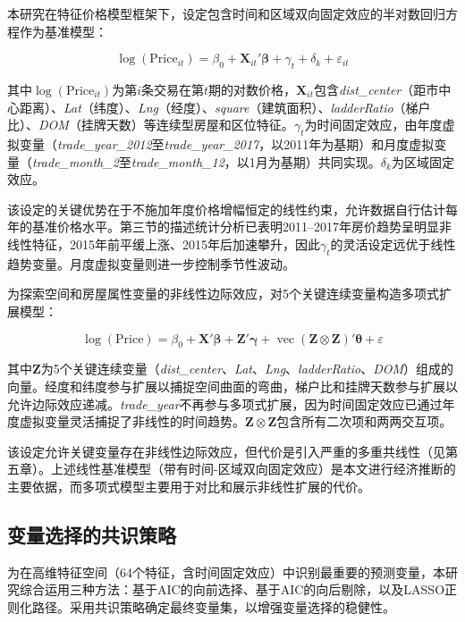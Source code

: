\documentclass[12pt,a4paper]{ctexart}
\begin{document}
本研究在特征价格模型框架下，设定包含时间和区域双向固定效应的半对数回归方程作为基准模型：

\begin{equation}\label{eq:baseline}
\log(\text{Price}_{it}) = \beta_0 + \bm{X}_{it}'\bm{\beta} + \gamma_t + \delta_k + \varepsilon_{it}
\end{equation}

其中$\log(\text{Price}_{it})$为第$i$条交易在第$t$期的对数价格，$\bm{X}_{it}$包含\textit{dist\_center}（距市中心距离）、\textit{Lat}（纬度）、\textit{Lng}（经度）、\textit{square}（建筑面积）、\textit{ladderRatio}（梯户比）、\textit{DOM}（挂牌天数）等连续型房屋和区位特征。$\gamma_t$为时间固定效应，由年度虚拟变量（\textit{trade\_year\_2012}至\textit{trade\_year\_2017}，以2011年为基期）和月度虚拟变量（\textit{trade\_month\_2}至\textit{trade\_month\_12}，以1月为基期）共同实现。$\delta_k$为区域固定效应。

该设定的关键优势在于不施加年度价格增幅恒定的线性约束，允许数据自行估计每年的基准价格水平。第三节的描述统计分析已表明2011--2017年房价趋势呈明显非线性特征，2015年前平缓上涨、2015年后加速攀升，因此$\gamma_t$的灵活设定远优于线性趋势变量。月度虚拟变量则进一步控制季节性波动。

为探索空间和房屋属性变量的非线性边际效应，对5个关键连续变量构造多项式扩展模型：

\begin{equation}\label{eq:poly}
\log(\text{Price}) = \beta_0 + \bm{X}'\bm{\beta} + \bm{Z}'\bm{\gamma} + \operatorname{vec}(\bm{Z} \otimes \bm{Z})'\bm{\theta} + \varepsilon
\end{equation}

其中$\bm{Z}$为5个关键连续变量（\textit{dist\_center}、\textit{Lat}、\textit{Lng}、\textit{ladderRatio}、\textit{DOM}）组成的向量。经度和纬度参与扩展以捕捉空间曲面的弯曲，梯户比和挂牌天数参与扩展以允许边际效应递减。\textit{trade\_year}不再参与多项式扩展，因为时间固定效应已通过年度虚拟变量灵活捕捉了非线性的时间趋势。$\bm{Z} \otimes \bm{Z}$包含所有二次项和两两交互项。

该设定允许关键变量存在非线性边际效应，但代价是引入严重的多重共线性（见第五章）。上述线性基准模型（带有时间-区域双向固定效应）是本文进行经济推断的主要依据，而多项式模型主要用于对比和展示非线性扩展的代价。

\subsection{变量选择的共识策略}

为在高维特征空间（64个特征，含时间固定效应）中识别最重要的预测变量，本研究综合运用三种方法：基于AIC的向前选择、基于AIC的向后剔除，以及LASSO正则化路径。采用共识策略确定最终变量集，以增强变量选择的稳健性。
\end{document}
